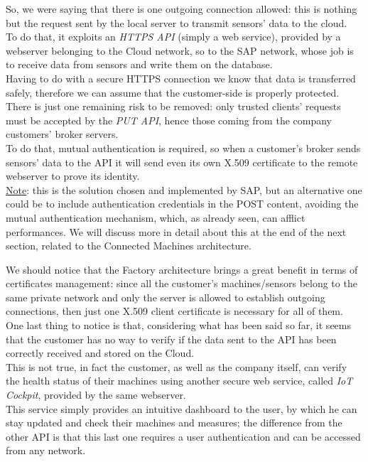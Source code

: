 \documentclass[12pt]{report}
\begin{document}
{So, we were saying that there is one outgoing connection allowed: this is nothing but the request sent by the local server to transmit sensors' data to the cloud.\\
To do that, it exploits an \emph{HTTPS API} (simply a web service), provided by a webserver belonging to the Cloud network, so to the SAP network, whose job is to receive data from sensors and write them on the database.\\
Having to do with a secure HTTPS connection we know that data is transferred safely, therefore we can assume that the customer-side is properly protected.\\

There is just one remaining risk to be removed: only trusted clients' requests must be accepted by the \emph{PUT API}, hence those coming from the company customers' broker servers.\\
To do that, mutual authentication is required, so when a customer's broker sends sensors' data to the API it will send even its own X.509 certificate to the remote webserver to prove its identity.\\
\underline{Note}: this is the solution chosen and implemented by SAP, but an alternative one could be to include authentication credentials in the POST content, avoiding the mutual authentication mechanism, which, as already seen, can afflict performances.
We will discuss more in detail about this at the end of the next section, related to the Connected Machines architecture.

We should notice that the Factory architecture brings a great benefit in terms of certificates management: since all the customer's machines/sensors belong to the same private network and only the server is allowed to establish outgoing connections, then just one X.509 client certificate is necessary for all of them.\\

One last thing to notice is that, considering what has been said so far, it seems that the customer has no way to verify if the data sent to the API has been correctly received and stored on the Cloud.\\
This is not true, in fact the customer, as well as the company itself, can verify the health status of their machines using another secure web service, called \emph{IoT Cockpit}, provided by the same webserver.\\
This service simply provides an intuitive dashboard to the user, by which he can stay updated and check their machines and measures; the difference from the other API is that this last one requires a user authentication and can be accessed from any network.\\


}
\end{document}
